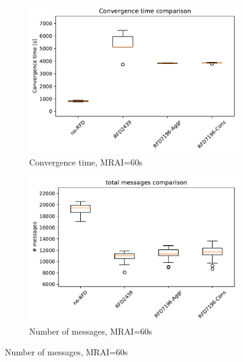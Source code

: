 \begin{figure}[H]
     \vfill
     \begin{subfigure}[b]{0.325\textwidth}
         \centering
         \includegraphics[width=\textwidth]{images/RFD/miceVSelephants/MultiMRAI/60/elephants/cisco_1000MRAI60_rfd_comparison_time_boxplot.pdf}
         \caption{\scriptsize Convergence time, MRAI=60s}
         \label{fig:1000_RFD_MRAI60_time_elephant}
     \end{subfigure}
     \hfill
     \begin{subfigure}[b]{0.325\textwidth}
         \centering
         \includegraphics[width=\textwidth]{images/RFD/miceVSelephants/MultiMRAI/60/elephants/cisco_1000MRAI60_rfd_comparison_messages_boxplot.pdf}
         \caption{\scriptsize Number of messages, MRAI=60s}
         \label{fig:1000_RFD_MRAI60_messages_elephant}
     \end{subfigure}

\end{figure}
